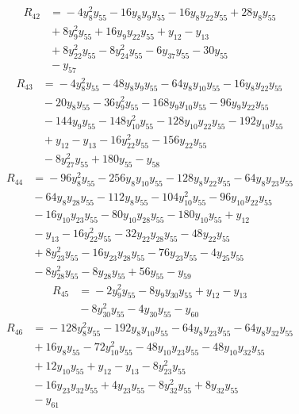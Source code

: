 \begin{align*}
R_{42} &={} -4y_{8}^{2}y_{55} -16y_{8}y_{9}y_{55} -16y_{8}y_{22}y_{55} +28y_{8}y_{55} \\
 &{} +8y_{9}^{2}y_{55} +16y_{9}y_{22}y_{55} +y_{12} -y_{13} \\
 &{} +8y_{22}^{2}y_{55} -8y_{24}^{2}y_{55} -6y_{37}y_{55} -30y_{55} \\
 &{} -y_{57}
\end{align*}
\begin{align*}
R_{43} &={} -4y_{8}^{2}y_{55} -48y_{8}y_{9}y_{55} -64y_{8}y_{10}y_{55} -16y_{8}y_{22}y_{55} \\
 &{} -20y_{8}y_{55} -36y_{9}^{2}y_{55} -168y_{9}y_{10}y_{55} -96y_{9}y_{22}y_{55} \\
 &{} -144y_{9}y_{55} -148y_{10}^{2}y_{55} -128y_{10}y_{22}y_{55} -192y_{10}y_{55} \\
 &{} +y_{12} -y_{13} -16y_{22}^{2}y_{55} -156y_{22}y_{55} \\
 &{} -8y_{27}^{2}y_{55} +180y_{55} -y_{58}
\end{align*}
\begin{align*}
R_{44} &={} -96y_{8}^{2}y_{55} -256y_{8}y_{10}y_{55} -128y_{8}y_{22}y_{55} -64y_{8}y_{23}y_{55} \\
 &{} -64y_{8}y_{28}y_{55} -112y_{8}y_{55} -104y_{10}^{2}y_{55} -96y_{10}y_{22}y_{55} \\
 &{} -16y_{10}y_{23}y_{55} -80y_{10}y_{28}y_{55} -180y_{10}y_{55} +y_{12} \\
 &{} -y_{13} -16y_{22}^{2}y_{55} -32y_{22}y_{28}y_{55} -48y_{22}y_{55} \\
 &{} +8y_{23}^{2}y_{55} -16y_{23}y_{28}y_{55} -76y_{23}y_{55} -4y_{25}y_{55} \\
 &{} -8y_{28}^{2}y_{55} -8y_{28}y_{55} +56y_{55} -y_{59}
\end{align*}
\begin{align*}
R_{45} &={} -2y_{9}^{2}y_{55} -8y_{9}y_{30}y_{55} +y_{12} -y_{13} \\
 &{} -8y_{30}^{2}y_{55} -4y_{30}y_{55} -y_{60}
\end{align*}
\begin{align*}
R_{46} &={} -128y_{8}^{2}y_{55} -192y_{8}y_{10}y_{55} -64y_{8}y_{23}y_{55} -64y_{8}y_{32}y_{55} \\
 &{} +16y_{8}y_{55} -72y_{10}^{2}y_{55} -48y_{10}y_{23}y_{55} -48y_{10}y_{32}y_{55} \\
 &{} +12y_{10}y_{55} +y_{12} -y_{13} -8y_{23}^{2}y_{55} \\
 &{} -16y_{23}y_{32}y_{55} +4y_{23}y_{55} -8y_{32}^{2}y_{55} +8y_{32}y_{55} \\
 &{} -y_{61}
\end{align*}
